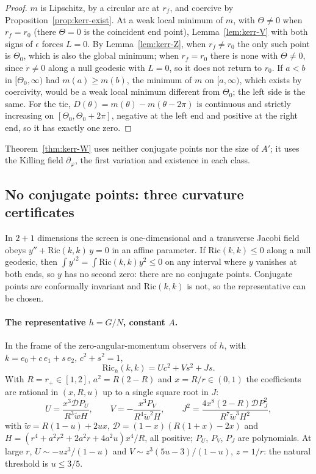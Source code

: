 \documentclass[aip,jmp,amsmath,amssymb,reprint]{revtex4-2}
\theoremstyle{plain}
\theoremstyle{definition}
\begin{document}
\begin{proof}
$m$ is Lipschitz, by a circular arc at $r_f$, and coercive by Proposition~\ref{prop:kerr-exist}. At a weak local minimum of $m$, with $\Theta\ne0$ when $r_f=r_0$ (there $\Theta=0$ is the coincident end point),
Lemma~\ref{lem:kerr-V} with both signs of $\epsilon$ forces $L=0$. By Lemma~\ref{lem:kerr-Z}, when $r_f\ne r_0$ the
only such point is $\Theta_0$, which is also the global minimum; when $r_f=r_0$ there is none with $\Theta\ne0$,
since $\dot r\ne0$ along a null geodesic with $L=0$, so it does not return to $r_0$. If $a<b$ in $[\Theta_0,\infty)$ had $m(a)\ge m(b)$, the minimum of $m$ on $[a,\infty)$, which exists by
coercivity, would be a weak local minimum different from $\Theta_0$; the left side is the same. For
the tie, $D(\theta)=m(\theta)-m(\theta-2\pi)$ is continuous and strictly increasing on $[\Theta_0,\Theta_0+2\pi]$, negative at
the left end and positive at the right end, so it has exactly one zero.
\end{proof}

Theorem~\ref{thm:kerr-W} uses neither conjugate points nor the size of $A'$; it uses the Killing
field $\partial_\varphi$, the first variation and existence in each class.

\subsection{No conjugate points: three curvature certificates}

In $2+1$ dimensions the screen is one-dimensional and a transverse Jacobi field obeys
$y''+\mathrm{Ric}(k,k)\,y=0$ in an affine parameter. If $\mathrm{Ric}(k,k)\le0$ along a null geodesic, then
$\int y'^2=\int\mathrm{Ric}(k,k)y^2\le0$ on any interval where $y$ vanishes at both ends, so $y$ has no second
zero: there are no conjugate points. Conjugate points are conformally invariant and
$\mathrm{Ric}(k,k)$ is not, so the representative can be chosen.

\paragraph{The representative $h=G/N$, constant $A$.} In the frame of the zero-angular-momentum
observers of $h$, with $k=e_0+c\,e_1+s\,e_2$, $c^2+s^2=1$,
\[
  \mathrm{Ric}_h(k,k)=U c^2+V s^2+J s .
\]
With $R=r_+\in[1,2]$, $a^2=R(2-R)$ and $x=R/r\in(0,1)$ the coefficients are rational in
$(x,R,u)$ up to a single square root in $J$:
\[
  U=\frac{x^3\mathcal DP_U}{R^3\tilde wH},\qquad V=-\frac{x^3P_V}{R^4\tilde w^2H},\qquad
  J^2=\frac{4x^8(2-R)\mathcal DP_J^2}{R^7\tilde w^3H^2},
\]
with $\tilde w=R(1-u)+2ux$, $\mathcal D=(1-x)(R(1+x)-2x)$ and $H=(r^4+a^2r^2+2a^2r+4a^2u)x^4/R$, all
positive; $P_U$, $P_V$, $P_J$ are polynomials. At large $r$, $U\sim-uz^3/(1-u)$ and
$V\sim z^3(5u-3)/(1-u)$, $z=1/r$: the natural threshold is $u\le3/5$.
\end{document}
